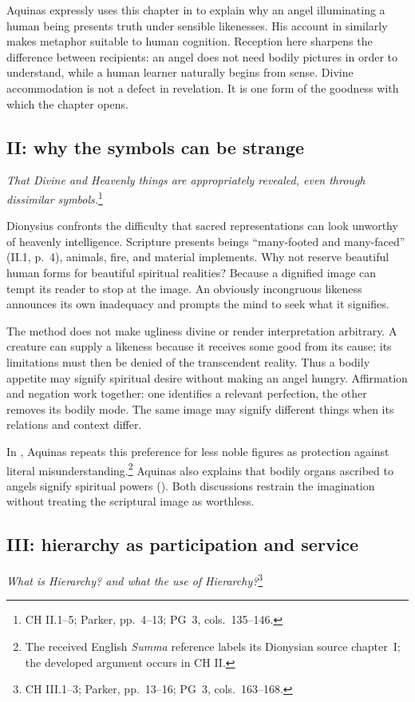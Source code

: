 Aquinas expressly uses this chapter in  to explain why an angel illuminating a human being presents truth under sensible likenesses. His account in  similarly makes metaphor suitable to human cognition. Reception here sharpens the difference between recipients: an angel does not need bodily pictures in order to understand, while a human learner naturally begins from sense. Divine accommodation is not a defect in revelation. It is one form of the goodness with which the chapter opens.

\subsection{II: why the symbols can be strange}
\emph{That Divine and Heavenly things are appropriately revealed, even through dissimilar symbols.}\footnote{CH II.1--5; Parker, pp.~4--13; PG~3, cols.~135--146.}

Dionysius confronts the difficulty that sacred representations can look unworthy of heavenly intelligence. Scripture presents beings ``many-footed and many-faced'' (II.1, p.~4), animals, fire, and material implements. Why not reserve beautiful human forms for beautiful spiritual realities? Because a dignified image can tempt its reader to stop at the image. An obviously incongruous likeness announces its own inadequacy and prompts the mind to seek what it signifies.

The method does not make ugliness divine or render interpretation arbitrary. A creature can supply a likeness because it receives some good from its cause; its limitations must then be denied of the transcendent reality. Thus a bodily appetite may signify spiritual desire without making an angel hungry. Affirmation and negation work together: one identifies a relevant perfection, the other removes its bodily mode. The same image may signify different things when its relations and context differ.

In , Aquinas repeats this preference for less noble figures as protection against literal misunderstanding.\footnote{The received English \emph{Summa} reference labels its Dionysian source chapter~I; the developed argument occurs in CH II.} Aquinas also explains that bodily organs ascribed to angels signify spiritual powers (). Both discussions restrain the imagination without treating the scriptural image as worthless.

\subsection{III: hierarchy as participation and service}
\emph{What is Hierarchy? and what the use of Hierarchy?}\footnote{CH III.1--3; Parker, pp.~13--16; PG~3, cols.~163--168.}

